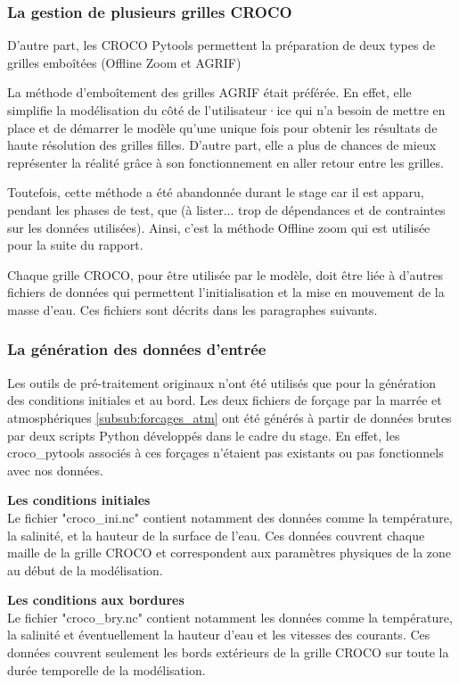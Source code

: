 \documentclass[10pt,a4paper,titlepage]{article}
\begin{document}
\subsubsection{La gestion de plusieurs grilles CROCO}
\label{subsub:gestion_multigrid}
D'autre part, les CROCO Pytools permettent la préparation de deux types de grilles emboîtées (Offline Zoom et AGRIF)

La méthode d'emboîtement des grilles AGRIF était préférée.
En effet, elle simplifie la modélisation du côté de l'utilisateur·ice qui n'a besoin de mettre en place et de démarrer le modèle qu'une unique fois pour obtenir les résultats de haute résolution des grilles filles.
D'autre part, elle a plus de chances de mieux représenter la réalité grâce à son fonctionnement en aller retour entre les grilles.

Toutefois, cette méthode a été abandonnée durant le stage car il est apparu, pendant les phases de test, que
(à lister... trop de dépendances et de contraintes sur les données utilisées).
Ainsi, c'est la méthode Offline zoom qui est utilisée pour la suite du rapport.

Chaque grille CROCO, pour être utilisée par le modèle, doit être liée à d'autres fichiers de données qui permettent l'initialisation et la mise en mouvement de la masse d'eau. Ces fichiers sont décrits dans les paragraphes suivants.

\subsubsection{La génération des données d'entrée}
\label{generation donnees entrée}
Les outils de pré-traitement originaux n'ont été utilisés que pour la génération des conditions initiales et au bord.
Les deux fichiers de forçage par la marrée et atmosphériques \ref{subsub:forcages_atm} ont été générés à partir de données brutes par deux scripts Python développés dans le cadre du stage.
En effet, les croco\_pytools associés à ces forçages n'étaient pas existants ou pas fonctionnels avec nos données.

\textbf{Les conditions initiales}\\
\label{par:cond_init}
Le fichier "croco\_ini.nc" contient notamment des données comme la température, la salinité, et la hauteur de la surface de l'eau. Ces données couvrent chaque maille de la grille CROCO et correspondent aux paramètres physiques de la zone au début de la modélisation.

\textbf{Les conditions aux bordures}\\
\label{par:cond_bords}
Le fichier "croco\_bry.nc" contient notamment les données comme la température, la salinité et éventuellement la hauteur d'eau et les vitesses des courants. Ces données couvrent seulement les bords extérieurs de la grille CROCO sur toute la durée temporelle de la modélisation.
\end{document}
